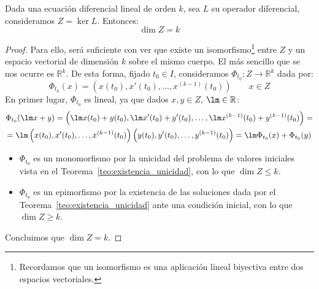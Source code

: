 \begin{teo}\label{teo:dim}
    Dada una ecuación diferencial lineal de orden $k$, sea $L$ su operador diferencial, consideramos $Z = \ker L$. Entonces:
    \begin{equation*}
        \dim Z = k
    \end{equation*}
    \begin{proof}
        Para ello, será suficiente con ver que existe un isomorfismo\footnote{Recordamos que un isomorfismo es una aplicación lineal biyectiva entre dos espacios vectoriales.} entre $Z$ y un espacio vectorial de dimensión $k$ sobre el mismo cuerpo. El más sencillo que se nos ocurre es $\mathbb{R}^k$. De esta forma, fijado $t_0\in I$, consideramos $\Phi_{t_0}:Z\rightarrow \mathbb{R}^k$ dada por:
        \begin{equation*}
            \Phi_{t_0}(x) = \left(x(t_0), x'(t_0), \ldots, x^{(k-1)}(t_0)\right) \qquad x\in Z
        \end{equation*}
        En primer lugar, $\Phi_{t_0}$ es lineal, ya que dados $x,y\in Z$, $\lm \in \mathbb{R}$:
        \begin{multline*}
            \Phi_{t_0}(\lm x+y) = \left(\lm x(t_0) + y(t_0), \lm x'(t_0) + y'(t_0), \ldots, \lm x^{(k-1)}(t_0) + y^{(k-1)}(t_0)\right) = \\
            =\lm \left(x(t_0), x'(t_0), \ldots, x^{(k-1)}(t_0)\right)\left(y(t_0), y'(t_0), \ldots, y^{(k-1)}(t_0)\right) = \lm \Phi_{t_0}(x) + \Phi_{t_0}(y)
        \end{multline*}

        \begin{itemize}
            \item $\Phi_{t_0}$ es un monomorfismo por la unicidad del problema de valores iniciales vista en el Teorema~\ref{teo:existencia_unicidad}, con lo que $\dim Z \leq k$.
            \item $\Phi_{t_0}$ es un epimorfismo por la existencia de las soluciones dada por el Teorema~\ref{teo:existencia_unicidad} ante una condición inicial, con lo que $\dim Z \geq k$.
        \end{itemize}
        Concluimos que $\dim Z = k$.
    \end{proof}
\end{teo}


